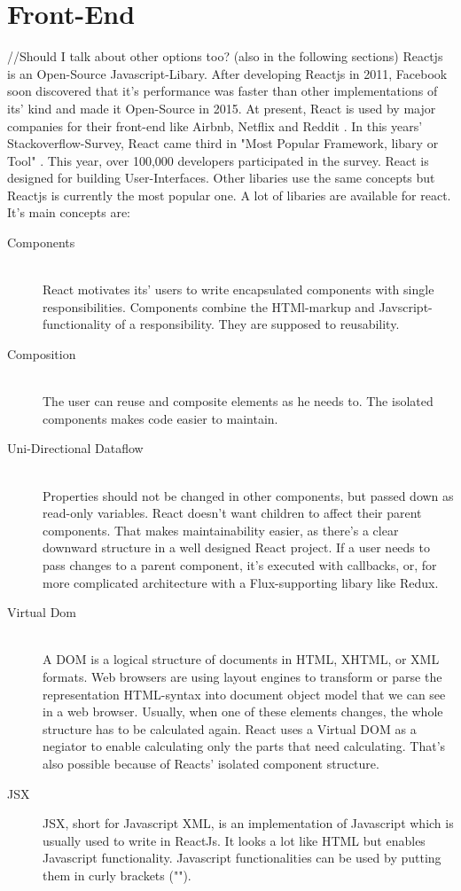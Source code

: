 \section{Front-End}
//Should I talk about other options too? (also in the following sections)
Reactjs is an Open-Source Javascript-Libary.
After developing Reactjs in 2011, Facebook soon discovered that it's performance was faster than other implementations of its' kind and made it Open-Source in 2015. 
At present, React is used by major companies for their front-end like Airbnb, Netflix and Reddit \parencite{reactjsUsers}. 
In this years' Stackoverflow-Survey, React came third in "Most Popular Framework, libary or Tool" \parencite{stackOverflowSurvey}. 
This year, over 100,000 developers participated in the survey. 
React is designed for building User-Interfaces. Other libaries %
use the same concepts but Reactjs is currently the most popular one.
A lot of libaries are available for react. 
It's main concepts are:
\begin{description}
    \item[Components] \hfill \\
    React motivates its' users to write encapsulated components with single responsibilities. Components combine the HTMl-markup and Javscript-functionality of a responsibility. They are supposed to reusability. %
    \item[Composition] \hfill \\
    The user can reuse and composite elements as he needs to. The isolated components makes code easier to maintain. 
    \item[Uni-Directional Dataflow] \hfill \\
            Properties should not be changed in other components, but passed down as read-only variables. 
            React doesn't want children to affect their parent components. That makes maintainability easier, as there's a clear downward structure in a well designed React project.
            If a user needs to pass changes to a parent component, it's executed with callbacks, or, for more complicated architecture with a Flux-supporting libary like Redux.
    \item[Virtual Dom]\hfill \\
    A DOM%
    is a logical structure of documents in HTML, XHTML, or XML formats. 
    Web browsers are using layout engines to transform or parse the representation HTML-syntax into document object model that we can see in a web browser.
    Usually, when one of these elements changes, the whole structure has to be calculated again. 
    React uses a Virtual DOM as a negiator to enable calculating only the parts that need calculating. That's also possible because of Reacts' isolated component structure.
    \item[JSX]  JSX, short for Javascript XML, is an implementation of Javascript which is usually used to write in ReactJs. 
    It looks a lot like HTML but enables Javascript functionality. Javascript functionalities can be used by putting them in curly brackets ("{}").
\end{description}
